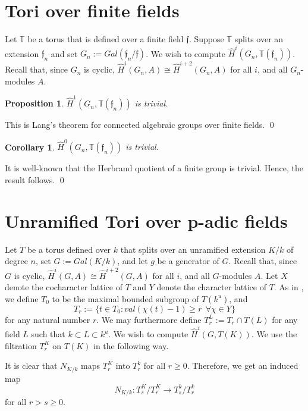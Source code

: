 \documentclass[11pt]{amsart}
\theoremstyle{plain}
\newtheorem{corollary}[enumi]{Corollary}
\newtheorem{proposition}[enumi]{Proposition}
\begin{document}
\section{Tori over finite fields}

Let $\mathbb{T}$ be a torus that is defined over a finite field $\mathfrak{f}$.  Suppose $\mathbb{T}$ splits over an extension $\mathfrak{f}_n$ and set $G_n := Gal(\mathfrak{f}_n/\mathfrak{f})$.  We wish to compute
$\hat{H}^i(G_n,\mathbb{T}(\mathfrak{f}_n))$.  Recall that, since $G_n$ is cyclic, $\hat{H}^{i}(G_n,A)\cong \hat{H}^{i+2}(G_n,A)$ for all $i$, and all $G_n$-modules $A$.

\begin{proposition}\label{trivialH1finitefields}
$\hat{H}^1(G_n,\mathbb{T}(\mathfrak{f}_n))$ is trivial.
\end{proposition}

\proof
This is Lang's theorem for connected algebraic groups over finite fields.
\qed

\begin{corollary}
$\hat{H}^0(G_n,\mathbb{T}(\mathfrak{f}_n))$ is trivial.
\end{corollary}

\proof
It is well-known that the Herbrand quotient of a finite group is trivial.  Hence, the result follows.
\qed

\section{Unramified Tori over p-adic fields}

Let $T$ be a torus defined over $k$ that splits over an unramified extension $K/k$ of degree $n$, set $G := Gal(K/k)$, and let $g$ be a generator of $G$.  Recall that, since $G$ is cyclic, $\hat{H}^{i}(G,A)\cong \hat{H}^{i+2}(G,A)$ for all $i$, and all $G$-modules $A$.  Let $X$ denote the cocharacter lattice of $T$ and $Y$ denote the character lattice of $T$.  As in \cite[Section 3]{moyprasad1}, we define $T_0$ to be the maximal bounded subgroup of $T(k^u)$, and $$T_r := \{t \in T_0 : val(\chi(t) - 1) \geq r \ \ \forall \chi \in Y \}$$ for any natural number $r$.  We may furthermore define $T_r^L := T_r \cap T(L)$ for any field $L$ such that $k \subset L \subset k^u$.  We wish to compute $\hat{H}^i(G, T(K))$.  We use the filtration $T_r^K$ on $T(K)$ in the following way.

It is clear that $N_{K/k}$ maps $T_r^K$ into $T_r^k$ for all $r \geq 0$.  Therefore, we get an induced map $$N_{K/k} : T_s^K / T_{r}^K \rightarrow T_s^k / T_{r}^k$$ for all $r > s \geq 0$.
\end{document}
